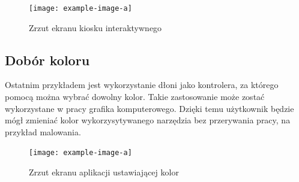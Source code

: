\begin{figure}[H]
    \begin{center}
        \texttt{[image: example-image-a]}
        \caption{Zrzut ekranu kiosku interaktywnego}
    \end{center}
\end{figure}

\subsection{Dobór koloru}
\quad Ostatnim przykładem jest wykorzystanie dłoni jako kontrolera, za którego pomocą można wybrać dowolny kolor. Takie zastosowanie może zostać wykorzystane w pracy grafika komputerowego. Dzięki temu użytkownik będzie mógł zmieniać kolor wykorzysytywanego narzędzia bez przerywania pracy, na przykład malowania. 

\begin{figure}[H]
    \begin{center}
        \texttt{[image: example-image-a]}
        \caption{Zrzut ekranu aplikacji ustawiającej kolor}
    \end{center}
\end{figure}